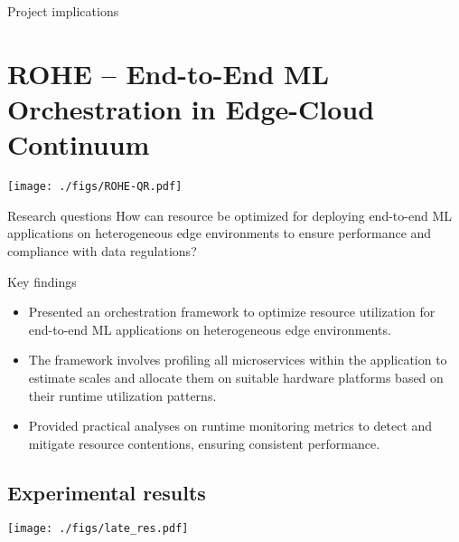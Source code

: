 \documentclass[landscape,a0,final]{a0poster} %
\newcommand{\sectionspace}{10mm} %
\begin{document}
\begin{minipage}{0.98\linewidth}
\begin{minipage}[t]{0.3\linewidth}
\begin{myframe}{Project implications}
\end{myframe}

\end{minipage} %
\hspace{0.03\linewidth} %
\begin{minipage}[t]{0.3\linewidth}
\setlength{\parindent}{10mm} %
\vspace{\sectionspace}
\section{ROHE -- End-to-End ML Orchestration in Edge-Cloud Continuum}
\begin{center}
\texttt{[image: ./figs/ROHE-QR.pdf]}
\end{center}
\begin{myframe}{Research questions}
    How can resource be optimized for deploying end-to-end ML applications on heterogeneous edge environments to ensure performance and compliance with data regulations?
\end{myframe}

\begin{myframe}{Key findings}
\begin{itemize}
    \item Presented an orchestration framework to optimize resource utilization for end-to-end ML applications on heterogeneous edge environments.
    \item The framework involves profiling all microservices within the application to estimate scales and allocate them on suitable hardware platforms based on their runtime utilization patterns.
    \item Provided practical analyses on runtime monitoring metrics to detect and mitigate resource contentions, ensuring consistent performance.
\end{itemize}
\end{myframe}

\subsection*{Experimental results}

\begin{center}
\texttt{[image: ./figs/late\_res.pdf]}
\end{center}
\vspace{-20pt}

\end{minipage}
\end{minipage}
\end{document}
